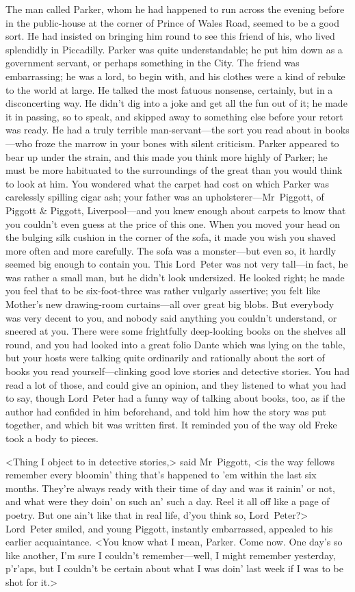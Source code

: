 The man called Parker, whom he had happened to run across the evening before in the public-house at the corner of Prince of Wales Road, seemed to be a good sort. He had insisted on bringing him round to see this friend of his, who lived splendidly in Piccadilly. Parker was quite understandable; he put him down as a government servant, or perhaps something in the City. The friend was embarrassing; he was a lord, to begin with, and his clothes were a kind of rebuke to the world at large. He talked the most fatuous nonsense, certainly, but in a disconcerting way. He didn't dig into a joke and get all the fun out of it; he made it in passing, so to speak, and skipped away to something else before your retort was ready. He had a truly terrible man-servant—the sort you read about in books—who froze the marrow in your bones with silent criticism. Parker appeared to bear up under the strain, and this made you think more highly of Parker; he must be more habituated to the surroundings of the great than you would think to look at him. You wondered what the carpet had cost on which Parker was carelessly spilling cigar ash; your father was an upholsterer—Mr~Piggott, of Piggott \& Piggott, Liverpool—and you knew enough about carpets to know that you couldn't even guess at the price of this one. When you moved your head on the bulging silk cushion in the corner of the sofa, it made you wish you shaved more often and more carefully. The sofa was a monster—but even so, it hardly seemed big enough to contain you. This Lord~Peter was not very tall—in fact, he was rather a small man, but he didn't look undersized. He looked right; he made you feel that to be six-foot-three was rather vulgarly assertive; you felt like Mother's new drawing-room curtains—all over great big blobs. But everybody was very decent to you, and nobody said anything you couldn't understand, or sneered at you. There were some frightfully deep-looking books on the shelves all round, and you had looked into a great folio Dante which was lying on the table, but your hosts were talking quite ordinarily and rationally about the sort of books you read yourself—clinking good love stories and detective stories. You had read a lot of those, and could give an opinion, and they listened to what you had to say, though Lord~Peter had a funny way of talking about books, too, as if the author had confided in him beforehand, and told him how the story was put together, and which bit was written first. It reminded you of the way old Freke took a body to pieces.

<Thing I object to in detective stories,> said Mr~Piggott, <is the way fellows remember every bloomin' thing that's happened to 'em within the last six months. They're always ready with their time of day and was it rainin' or not, and what were they doin' on such an' such a day. Reel it all off like a page of poetry. But one ain't like that in real life, d'you think so, Lord~Peter?> Lord~Peter smiled, and young Piggott, instantly embarrassed, appealed to his earlier acquaintance. <You know what I mean, Parker. Come now. One day's so like another, I'm sure I couldn't remember—well, I might remember yesterday, p'r'aps, but I couldn't be certain about what I was doin' last week if I was to be shot for it.>

